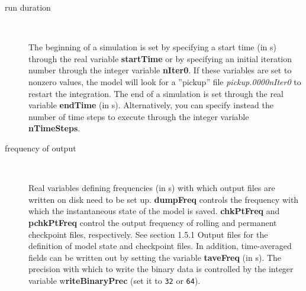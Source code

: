 \begin{description}
\item[run duration] \ 
  
  The beginning of a simulation is set by specifying a start time (in
  s) through the real variable \textbf{startTime} or by specifying an
  initial iteration number through the integer variable
  \textbf{nIter0}. If these variables are set to nonzero values, the
  model will look for a ''pickup'' file \textit{pickup.0000nIter0} to
  restart the integration. The end of a simulation is set through the
  real variable \textbf{endTime} (in s).  Alternatively, you can
  specify instead the number of time steps to execute through the
  integer variable \textbf{nTimeSteps}.

\item[frequency of output] \
  
  Real variables defining frequencies (in s) with which output files
  are written on disk need to be set up. \textbf{dumpFreq} controls
  the frequency with which the instantaneous state of the model is
  saved. \textbf{chkPtFreq} and \textbf{pchkPtFreq} control the output
  frequency of rolling and permanent checkpoint files, respectively.
  See section 1.5.1 Output files for the definition of model state and
  checkpoint files. In addition, time-averaged fields can be written
  out by setting the variable \textbf{taveFreq} (in s).  The precision
  with which to write the binary data is controlled by the integer
  variable w\textbf{riteBinaryPrec} (set it to \texttt{32} or
  \texttt{64}).

\end{description}


